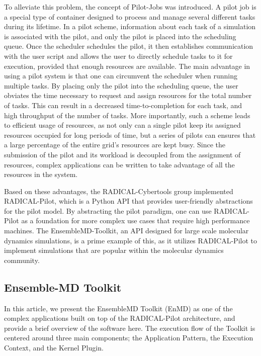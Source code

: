 \documentclass[]{article}
\begin{document}
	To alleviate this problem, the concept of Pilot-Jobs was introduced. A pilot job is a special type of container designed to process and manage several different tasks during its lifetime. In a pilot scheme, information about each task of a simulation is associated with the pilot, and only the pilot is placed into the scheduling queue. Once the scheduler schedules the pilot, it then establishes communication with the user script and allows the user to directly schedule tasks to it for execution, provided that enough resources are available. The main advantage in using a pilot system is that one can circumvent the scheduler when running multiple tasks. By placing only the pilot into the scheduling queue, the user obviates the time necessary to request and assign resources for the total number of tasks. This can result in a decreased time-to-completion for each task, and high throughput of the number of tasks. More importantly, such a scheme leads to efficient usage of resources, as not only can a single pilot keep its assigned resources occupied for long periods of time, but a series of pilots can ensures that a large percentage of the entire grid's resources are kept busy. Since the submission of the pilot and its workload is decoupled from the assignment of resources, complex applications can be written to take advantage of all the resources in the system.

	Based on these advantages, the RADICAL-Cybertools group implemented RADICAL-Pilot, which is a Python API that provides user-friendly abstractions for the pilot model. By abstracting the pilot paradigm, one can use RADICAL-Pilot as a foundation for more complex use cases that require high performance machines. The EnsembleMD-Toolkit, an API designed for large scale molecular dynamics simulations, is a prime example of this, as it utilizes RADICAL-Pilot to implement simulations that are popular within the molecular dynamics community.

		\subsection{Ensemble-MD Toolkit} 
			In this article, we present the EnsembleMD Toolkit (EnMD) as one of the complex applications built on top of the RADICAL-Pilot architecture, and provide a brief overview of the software here. The execution flow of the Toolkit is centered around three main components; the Application Pattern, the Execution Context, and the Kernel Plugin. 
\end{document}
